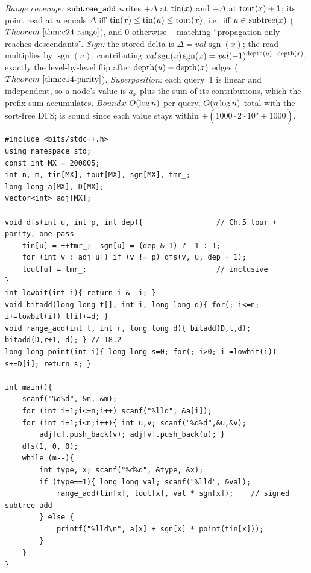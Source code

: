 \begin{proofbox}
\emph{Range coverage:} \(\texttt{subtree\_add}\) writes \(+\Delta\) at
\(\operatorname{tin}(x)\) and \(-\Delta\) at \(\operatorname{tout}(x)+1\); its point read at \(u\) equals
\(\Delta\) iff \(\operatorname{tin}(x)\le\operatorname{tin}(u)\le\operatorname{tout}(x)\), i.e.\ iff \(u\in\operatorname{subtree}(x)\)
(\(\thmref{c24-range}\)), and \(0\) otherwise -- matching ``propagation only
reaches descendants''.  \emph{Sign:} the stored delta is
\(\Delta=\mathit{val}\operatorname{sgn}(x)\); the read multiplies by
\(\operatorname{sgn}(u)\), contributing
\(\mathit{val}\operatorname{sgn}(u)\operatorname{sgn}(x)=\mathit{val}(-1)^{\operatorname{depth}(u)-\operatorname{depth}(x)}\),
exactly the level-by-level flip after \(\operatorname{depth}(u)-\operatorname{depth}(x)\) edges
(\(\thmref{c14-parity}\)).  \emph{Superposition:} each query~1 is linear and
independent, so a node's value is \(a_x\) plus the sum of its contributions,
which the prefix sum accumulates.  \emph{Bounds:} \(O(\log n)\) per query,
\(O(n\log n)\) total with the sort-free DFS;  is sound
since each value stays within \(\pm(1000\cdot2\cdot10^5+1000)\).
\end{proofbox}

\begin{lstlisting}[caption={CF 383C: Euler tour + one difference BIT with a depth-parity sign}, label={lst:c14-383-soln}]
#include <bits/stdc++.h>
using namespace std;
const int MX = 200005;
int n, m, tin[MX], tout[MX], sgn[MX], tmr_;
long long a[MX], D[MX];
vector<int> adj[MX];

void dfs(int u, int p, int dep){                 // Ch.5 tour + parity, one pass
    tin[u] = ++tmr_;  sgn[u] = (dep & 1) ? -1 : 1;
    for (int v : adj[u]) if (v != p) dfs(v, u, dep + 1);
    tout[u] = tmr_;                              // inclusive
}
int lowbit(int i){ return i & -i; }
void bitadd(long long t[], int i, long long d){ for(; i<=n; i+=lowbit(i)) t[i]+=d; }
void range_add(int l, int r, long long d){ bitadd(D,l,d); bitadd(D,r+1,-d); } // 18.2
long long point(int i){ long long s=0; for(; i>0; i-=lowbit(i)) s+=D[i]; return s; }

int main(){
    scanf("%d%d", &n, &m);
    for (int i=1;i<=n;i++) scanf("%lld", &a[i]);
    for (int i=1;i<n;i++){ int u,v; scanf("%d%d",&u,&v);
        adj[u].push_back(v); adj[v].push_back(u); }
    dfs(1, 0, 0);
    while (m--){
        int type, x; scanf("%d%d", &type, &x);
        if (type==1){ long long val; scanf("%lld", &val);
            range_add(tin[x], tout[x], val * sgn[x]);    // signed subtree add
        } else {
            printf("%lld\n", a[x] + sgn[x] * point(tin[x]));
        }
    }
}
\end{lstlisting}

